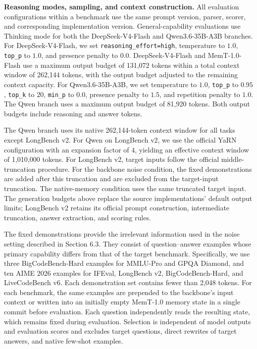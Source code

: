 \textbf{Reasoning modes, sampling, and context construction.}
All evaluation configurations within a benchmark use the same prompt version, parser, scorer, and corresponding implementation version.
General-capability evaluations use Thinking mode for both the DeepSeek-V4-Flash and Qwen3.6-35B-A3B branches.
For DeepSeek-V4-Flash, we set \texttt{reasoning\_effort=high}, temperature to $1.0$, \texttt{top\_p} to $1.0$, and presence penalty to $0.0$.
DeepSeek-V4-Flash and MemT-1.0-Flash use a maximum output budget of 131,072 tokens within a total context window of 262,144 tokens, with the output budget adjusted to the remaining context capacity.
For Qwen3.6-35B-A3B, we set temperature to $1.0$, \texttt{top\_p} to $0.95$, \texttt{top\_k} to $20$, \texttt{min\_p} to $0.0$, presence penalty to $1.5$, and repetition penalty to $1.0$.
The Qwen branch uses a maximum output budget of 81,920 tokens.
Both output budgets include reasoning and answer tokens.

The Qwen branch uses its native 262,144-token context window for all tasks except LongBench v2.
For Qwen on LongBench v2, we use the official YaRN configuration with an expansion factor of $4$, yielding an effective context window of 1,010,000 tokens.
For LongBench v2, target inputs follow the official middle-truncation procedure.
For the backbone noise condition, the fixed demonstrations are added after this truncation and are excluded from the target-input truncation.
The native-memory condition uses the same truncated target input.
The generation budgets above replace the source implementations' default output limits; LongBench v2 retains its official prompt construction, intermediate truncation, answer extraction, and scoring rules.

The fixed demonstrations provide the irrelevant information used in the noise setting described in Section 6.3. They consist of question–answer examples whose primary capability differs from that of the target benchmark. Specifically, we use three BigCodeBench-Hard examples for MMLU-Pro and GPQA Diamond, and ten AIME 2026 examples for IFEval, LongBench v2, BigCodeBench-Hard, and LiveCodeBench v6. Each demonstration set contains fewer than 2,048 tokens. For each benchmark, the same examples are prepended to the backbone’s input context or written into an initially empty MemT-1.0 memory state in a single commit before evaluation. Each question independently reads the resulting state, which remains fixed during evaluation. Selection is independent of model outputs and evaluation scores and excludes target questions, direct rewrites of target answers, and native few-shot examples.


